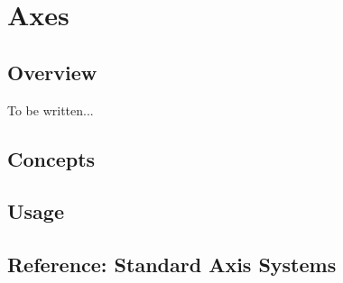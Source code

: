 %
%
%


\section{Axes}
\label{section-dv-axes}

\subsection{Overview}

To be written...


\subsection{Concepts}

\subsection{Usage}



\subsection{Reference: Standard Axis Systems}

